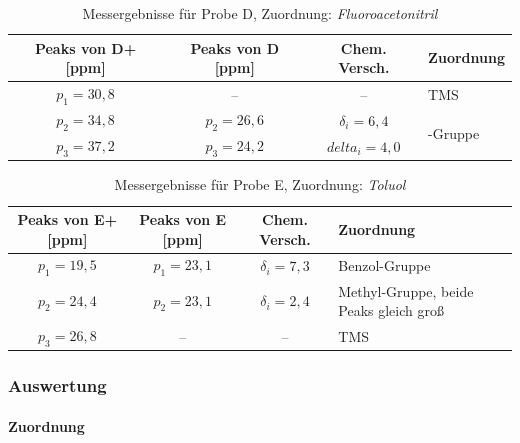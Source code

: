 \documentclass[a4paper]{scrartcl} %
\begin{document}
\begin{table}[!htb]
	\centering
	\caption{Messergebnisse für Probe D, Zuordnung: \emph{Fluoroacetonitril} }
	\label{tab:Probe_D}
	\begin{tabularx}{1.0\linewidth}{cccX}
	\toprule
	Peaks von D+ [ppm] & Peaks von D [ppm] & Chem. Versch. & Zuordnung \\
	\midrule
	$p_1 = 30,8$ & -- & -- & TMS \\

	$p_2 = 34,8$ & $p_2 = 26,6$ & $\delta_i = 6,4$ & \multirow{2}{*}{\ce{FCH2}-Gruppe} \\

	$p_3 = 37,2$ & $p_3 = 24,2$ & $delta_i = 4,0$ &  \\

	\bottomrule
	\end{tabularx}

\end{table}

\begin{table}[!htb]
	\centering
	\caption{Messergebnisse für Probe E, Zuordnung: \emph{Toluol} }
	\label{tab:Probe_E}
	\begin{tabularx}{1.0\linewidth}{cccX}
	\toprule
	Peaks von E+ [ppm] & Peaks von E [ppm] & Chem. Versch. & Zuordnung \\
	\midrule
	$p_1 = 19,5$ & $p_1 = 23,1$ & $\delta_i = 7,3 $ & Benzol-Gruppe \\

	$p_2 = 24,4$ & $p_2 = 23,1$ & $\delta_i = 2,4$ & Methyl-Gruppe, beide Peaks gleich groß \\

	$p_3 = 26,8$ & -- & -- & TMS \\

	\bottomrule
	\end{tabularx}

\end{table}

\subsubsection{Auswertung}
\paragraph{Zuordnung}
\end{document}
